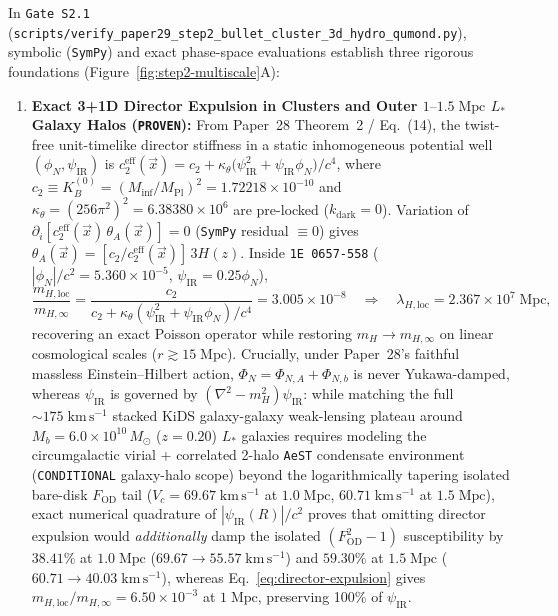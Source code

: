 \documentclass[11pt,a4paper]{article}
\begin{document}
In \texttt{Gate S2.1} (\texttt{scripts/\allowbreak verify\_paper29\_\allowbreak step2\_\allowbreak bullet\_cluster\_\allowbreak 3d\_hydro\_qumond.py}), symbolic (\texttt{SymPy}) and exact phase-space evaluations establish three rigorous foundations (Figure~\ref{fig:step2-multiscale}A):
\begin{enumerate}
    \item \textbf{Exact 3+1D Director Expulsion in Clusters and Outer $1\text{--}1.5\;\mathrm{Mpc}$ $L_*$ Galaxy Halos (\texttt{PROVEN}):} From Paper~28 Theorem~2 / Eq.~(14), the twist-free unit-timelike director stiffness in a static inhomogeneous potential well $(\phi_N, \psi_{\mathrm{IR}})$ is $c_2^{\mathrm{eff}}(\vec{x}) = c_2 + \kappa_\theta\bigl(\psi_{\mathrm{IR}}^2 + \psi_{\mathrm{IR}}\phi_N\bigr)/c^4$, where $c_2 \equiv K_B^{(0)} = (M_{\mathrm{inf}}/M_{\mathrm{Pl}})^2 = 1.72218\times 10^{-10}$ and $\kappa_\theta = (256\pi^2)^2 = 6.38380\times 10^6$ are pre-locked ($k_{\mathrm{dark}} = 0$). Variation of $\partial_i[c_2^{\mathrm{eff}}(\vec{x})\,\theta_A(\vec{x})] = 0$ (\texttt{SymPy} residual $\equiv 0$) gives $\theta_A(\vec{x}) = [c_2/c_2^{\mathrm{eff}}(\vec{x})]\,3H(z)$. Inside \texttt{1E~0657-558} ($|\phi_N|/c^2 = 5.360\times 10^{-5}$, $\psi_{\mathrm{IR}} = 0.25\phi_N$),
    \begin{equation}
        \frac{m_{H,\mathrm{loc}}}{m_{H,\infty}} = \frac{c_2}{c_2 + \kappa_\theta(\psi_{\mathrm{IR}}^2 + \psi_{\mathrm{IR}}\phi_N)/c^4} = 3.005\times 10^{-8} \quad\Longrightarrow\quad \lambda_{H,\mathrm{loc}} = 2.367\times 10^7\;\mathrm{Mpc},
        \label{eq:director-expulsion}
    \end{equation}
    recovering an exact Poisson operator while restoring $m_H \to m_{H,\infty}$ on linear cosmological scales ($r \gtrsim 15\;\mathrm{Mpc}$). Crucially, under Paper~28's faithful massless Einstein--Hilbert action, $\Phi_N = \Phi_{N,A} + \Phi_{N,b}$ is never Yukawa-damped, whereas $\psi_{\mathrm{IR}}$ is governed by $(\nabla^2 - m_H^2)\psi_{\mathrm{IR}}$: while matching the full $\sim 175\;\mathrm{km\,s^{-1}}$ stacked KiDS galaxy-galaxy weak-lensing plateau around $M_b = 6.0\times 10^{10}\,M_\odot$ ($z = 0.20$) $L_*$ galaxies \cite{Mistele2024} requires modeling the circumgalactic virial + correlated 2-halo \texttt{AeST} condensate environment (\texttt{CONDITIONAL} galaxy-halo scope) beyond the logarithmically tapering isolated bare-disk $F_{\mathrm{OD}}$ tail ($V_c = 69.67\;\mathrm{km\,s^{-1}}$ at $1.0\;\mathrm{Mpc}$, $60.71\;\mathrm{km\,s^{-1}}$ at $1.5\;\mathrm{Mpc}$), exact numerical quadrature of $|\psi_{\mathrm{IR}}(R)|/c^2$ proves that omitting director expulsion would \emph{additionally} damp the isolated $(F_{\mathrm{OD}}^2 - 1)$ susceptibility by $38.41\%$ at $1.0\;\mathrm{Mpc}$ ($69.67 \to 55.57\;\mathrm{km\,s^{-1}}$) and $59.30\%$ at $1.5\;\mathrm{Mpc}$ ($60.71 \to 40.03\;\mathrm{km\,s^{-1}}$), whereas Eq.~\eqref{eq:director-expulsion} gives $m_{H,\mathrm{loc}}/m_{H,\infty} = 6.50\times 10^{-3}$ at $1\;\mathrm{Mpc}$, preserving 100\% of $\psi_{\mathrm{IR}}$.

\end{enumerate}
\end{document}
